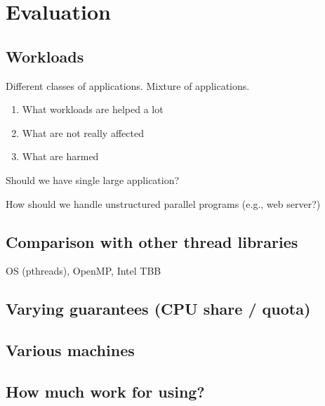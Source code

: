 \section{Evaluation}
\subsection{Workloads}
Different classes of applications. Mixture of applications.

\begin{enumerate}
  \item What workloads are helped a lot
  \item What are not really affected
  \item What are harmed
\end{enumerate}

Should we have single large application?

How should we handle unstructured parallel programs (e.g., web server?)

\subsection{Comparison with other thread libraries}
OS (pthreads), OpenMP, Intel TBB
\subsection{Varying guarantees (CPU share / quota)}

\subsection{Various machines}

\subsection{How much work for using?}
